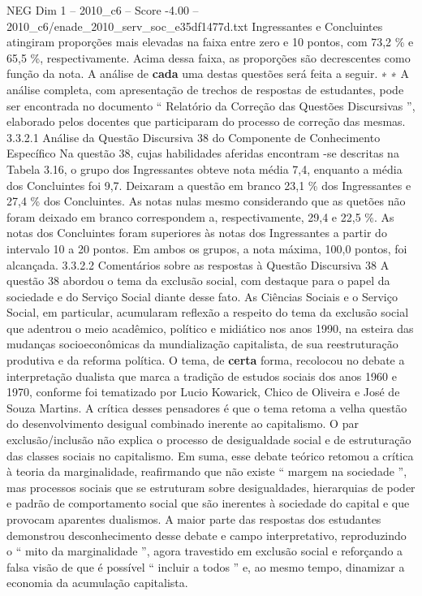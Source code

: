\begin{textsample}{NEG Dim 1 – 2010\_c6 – Score -4.00 – 2010\_c6/enade\_2010\_serv\_soc\_e35df1477d.txt}
Ingressantes e Concluintes atingiram proporções mais elevadas na faixa entre zero e 10 pontos, com 73,2 \% e 65,5 \%, respectivamente.
Acima dessa faixa, as proporções são decrescentes como função da nota.
A análise de \textbf{cada} uma destas questões será feita a seguir. ∗ ∗ A análise completa, com apresentação de trechos de respostas de estudantes, pode ser encontrada no documento “ Relatório da Correção das Questões Discursivas ”, elaborado pelos docentes que participaram do processo de correção das mesmas. 3.3.2.1 Análise da Questão Discursiva 38 do Componente de Conhecimento Específico Na questão 38, cujas habilidades aferidas encontram -se descritas na Tabela 3.16, o grupo dos Ingressantes obteve nota média 7,4, enquanto a média dos Concluintes foi 9,7.
Deixaram a questão em branco 23,1 \% dos Ingressantes e 27,4 \% dos Concluintes.
As notas nulas mesmo considerando que as quetões não foram deixado em branco correspondem a, respectivamente, 29,4 e 22,5 \%.
As notas dos Concluintes foram superiores às notas dos Ingressantes a partir do intervalo 10 a 20 pontos.
Em ambos os grupos, a nota máxima, 100,0 pontos, foi alcançada. 3.3.2.2 Comentários sobre as respostas à Questão Discursiva 38 A questão 38 abordou o tema da exclusão social, com destaque para o papel da sociedade e do Serviço Social diante desse fato.
As Ciências Sociais e o Serviço Social, em particular, acumularam reflexão a respeito do tema da exclusão social que adentrou o meio acadêmico, político e midiático nos anos 1990, na esteira das mudanças socioeconômicas da mundialização capitalista, de sua reestruturação produtiva e da reforma política.
O tema, de \textbf{certa} forma, recolocou no debate a interpretação dualista que marca a tradição de estudos sociais dos anos 1960 e 1970, conforme foi tematizado por Lucio Kowarick, Chico de Oliveira e José de Souza Martins.
A crítica desses pensadores é que o tema retoma a velha questão do desenvolvimento desigual combinado inerente ao capitalismo.
O par exclusão/inclusão não explica o processo de desigualdade social e de estruturação das classes sociais no capitalismo.
Em suma, esse debate teórico retomou a crítica à teoria da marginalidade, reafirmando que não existe “ margem na sociedade ”, mas processos sociais que se estruturam sobre desigualdades, hierarquias de poder e padrão de comportamento social que são inerentes à sociedade do capital e que provocam aparentes dualismos.
A maior parte das respostas dos estudantes demonstrou desconhecimento desse debate e campo interpretativo, reproduzindo o “ mito da marginalidade ”, agora travestido em exclusão social e reforçando a falsa visão de que é possível “ incluir a todos ” e, ao mesmo tempo, dinamizar a economia da acumulação capitalista.

\end{textsample}

